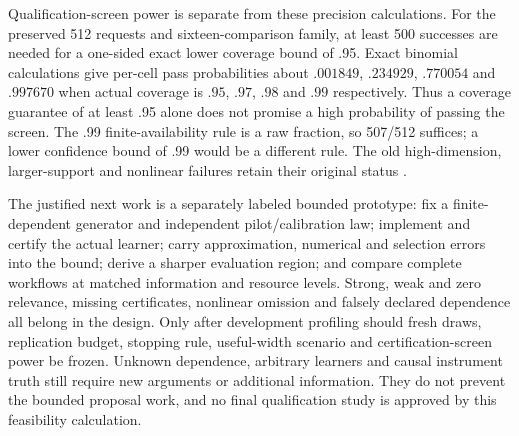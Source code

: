 Qualification-screen power is separate from these precision calculations.
For the preserved 512 requests and sixteen-comparison family, at
least 500 successes are needed for a one-sided exact lower coverage
bound of .95. Exact binomial calculations give per-cell pass
probabilities about $.001849$, $.234929$, $.770054$ and $.997670$
when actual coverage is $.95$, $.97$, $.98$ and $.99$ respectively.
Thus a coverage guarantee of at least .95 alone does not promise
a high probability of passing the screen. The .99 finite-availability
rule is a raw fraction, so 507/512 suffices; a lower confidence
bound of .99 would be a different rule. The old high-dimension,
larger-support and nonlinear failures retain their original status
\citep{exec13_ivrd_dependent}.

The justified next work is a separately labeled bounded prototype:
fix a finite-dependent generator and independent pilot/calibration
law; implement and certify the actual learner; carry approximation,
numerical and selection errors into the bound; derive a sharper
evaluation region; and compare complete workflows at matched
information and resource levels. Strong, weak and zero relevance,
missing certificates, nonlinear omission and falsely declared
dependence all belong in the design. Only after development profiling
should fresh draws, replication budget, stopping rule, useful-width
scenario and certification-screen power be frozen. Unknown
dependence, arbitrary learners and causal instrument truth still
require new arguments or additional information. They do not
prevent the bounded proposal work, and no final qualification
study is approved by this feasibility calculation.
\label{exec13:dependent-design-review-end}
